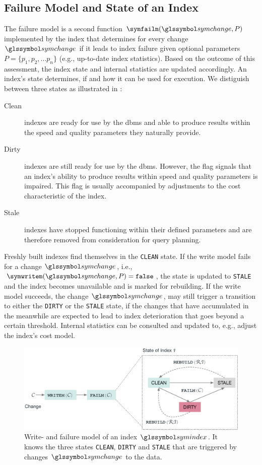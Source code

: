 \subsection{Failure Model and State of an Index}

The failure model is a second function $\symfailm(\symchange,P)$ implemented by the index that determines for every change $\symchange$ if it leads to index failure given optional parameters $P = \{p_1, p_2, \ldots p_n\}$ (e.g., up-to-date index statistics). Based on the outcome of this assessment, the index state and internal statistics are updated accordingly. An index's state determines, if and how it can be used for execution. We distiguish between three states as illustrated in :

\begin{description}
    \item[Clean] indexes are ready for use by the \acrshort{dbms} and able to produce results within the speed and quality parameters they naturally provide.
    \item[Dirty] indexes are still ready for use by the \acrshort{dbms}. However, the flag signals that an index's ability to produce results within speed and quality parameters is impaired. This flag is usually accompanied by adjustments to the cost characteristic of the index.
    \item[Stale] indexes have stopped functioning within their defined parameters and are therefore removed from consideration for query planning.
\end{description}

Freshly built indexes find themselves in the \texttt{CLEAN} state. If the write model fails for a change $\symchange$, i.e., $\symwritem(\symchange,P) = \mathtt{false}$, the state is updated to \texttt{STALE} and the index becomes unavailable and is marked for rebuilding. If the write model succeeds, the change $\symchange$, may still trigger a transition to either the \texttt{DIRTY} or the \texttt{STALE} state, if the changes that have accumulated in the meanwhile are expected to lead to index deterioration that goes beyond a certain threshold. Internal statistics can be consulted and updated to, e.g., adjust the index's cost model.

\begin{figure}[bt]
    \centering
    \includegraphics[width=\textwidth]{figures/failure_model.eps}
    \caption{Write- and failure model of an index $\symindex$. It knows the three states \texttt{CLEAN}, \texttt{DIRTY} and \texttt{STALE} that are triggered by changes $\symchange$ to the data.}
    \label{figure:failure_model}
\end{figure}

